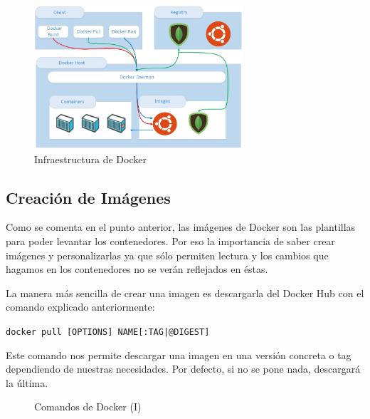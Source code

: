 \begin{figure}[htb]
\begin{center}
\includegraphics[width=0.69\textwidth]{./setup/Infraestructura}
\caption{Infraestructura de Docker}
\label{Inf:Infraestructura}
\end{center}
\end{figure}

\subsection{Creación de Imágenes}

Como se comenta en el punto anterior, las imágenes de Docker son las plantillas para
poder levantar los contenedores. Por eso la importancia de saber crear imágenes y personalizarlas ya que sólo permiten lectura y los cambios que hagamos en los contenedores no se verán reflejados en éstas.

La manera más sencilla de crear una imagen es descargarla del Docker Hub con el comando explicado anteriormente:

\begin{center}
\texttt{docker pull [OPTIONS] NAME[:TAG|@DIGEST]}
\end{center}

Este comando nos permite descargar una imagen en una versión concreta o tag dependiendo de nuestras necesidades. Por defecto, si no se pone nada, descargará la última. 

\begin{figure}[htb]
\begin{center}
\caption{Comandos de Docker (I)}
\label{Com1:ComandosDocker1}
\end{center}
\end{figure}

